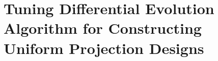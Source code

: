 \documentclass [PhD] {package/uclathes}
\begin{document}
\makeintropages
\introduction

%
%
%
%
%
\chapter{Tuning Differential Evolution Algorithm for Constructing Uniform Projection Designs}
%
%
\end{document}
